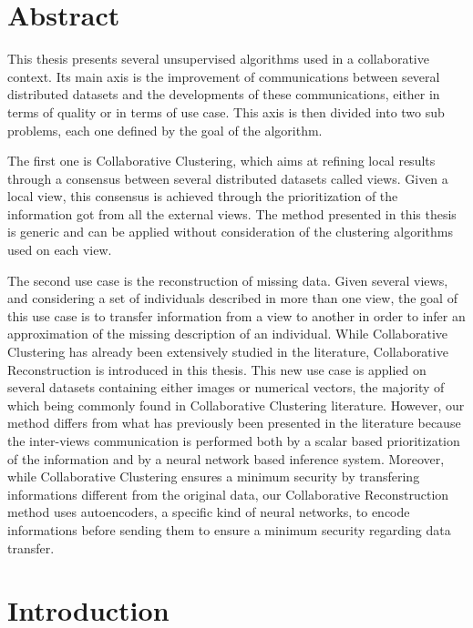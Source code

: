 \chapter*{Abstract}

This thesis presents several unsupervised algorithms used in a collaborative context. Its main axis is the improvement of communications between several distributed datasets and the developments of these communications, either in terms of quality or in terms of use case. This axis is then divided into two sub problems, each one defined by the goal of the algorithm.

The first one is Collaborative Clustering, which aims at refining local results through a consensus between several distributed datasets called views. Given a local view, this consensus is achieved through the prioritization of the information got from all the external views. The method presented in this thesis is generic and can be applied without consideration of the clustering algorithms used on each view.

The second use case is the reconstruction of missing data. Given several views, and considering a set of individuals described in more than one view, the goal of this use case is to transfer information from a view to another in order to infer an approximation of the missing description of an individual. While Collaborative Clustering has already been extensively studied in the literature, Collaborative Reconstruction is introduced in this thesis. This new use case is applied on several datasets containing either images or numerical vectors, the majority of which being commonly found in Collaborative Clustering literature. However, our method differs from what has previously been presented in the literature because the inter-views communication is performed both by a scalar based prioritization of the information and by a neural network based inference system. Moreover, while Collaborative Clustering ensures a minimum security by transfering informations different from the original data, our Collaborative Reconstruction method uses autoencoders, a specific kind of neural networks, to encode informations before sending them to ensure a minimum security regarding data transfer.

\chapter{Introduction}

\minitoc{}
\newpage

